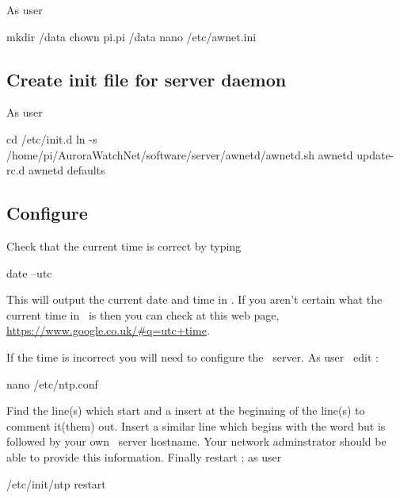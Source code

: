 As user \rootUser
\begin{Cmd}
mkdir /data
chown pi.pi /data
nano /etc/awnet.ini
\end{Cmd}


\subsection{Create init file for server daemon}
As user \rootUser
\begin{Cmd}
cd /etc/init.d
ln -s /home/pi/AuroraWatchNet/software/server/awnetd/awnetd.sh awnetd
update-rc.d  awnetd defaults
\end{Cmd}

\subsection{Configure \protect{}}
Check that the current time is correct by typing
\begin{Cmd}
date --utc
\end{Cmd}
This will output the current date and time in \utc. If you aren't
certain what the current time in \utc\ is then you can check at this
web page, \url{https://www.google.co.uk/#q=utc+time}.

If the time is incorrect you will need to configure the \ntp\
server. As user \rootUser\ edit :
\begin{Cmd}
nano /etc/ntp.conf
\end{Cmd}

Find the line(s) which start  and a insert
\filename{#} at the beginning of the line(s) to comment it(them)
out. Insert a similar line which begins with the word
 but is followed by your own \ntp\ server
hostname. Your network adminstrator should be able to provide this
information. Finally restart \ntp; as user \rootUser
\begin{Cmd}
/etc/init/ntp restart
\end{Cmd}
